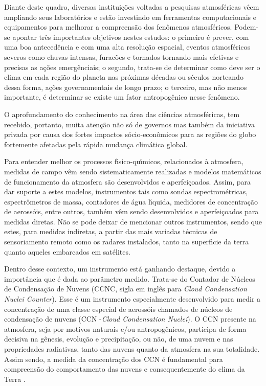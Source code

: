 Diante deste quadro, diversas institui\c{c}\~{o}es voltadas a pesquisas
atmosf\'{e}ricas v\^{e}em ampliando seus laborat\'{o}rios e est\~{a}o investindo em
ferramentas computacionais e equipamentos para melhorar a
compreens\~{a}o dos fen\^{o}menos atmosf\'{e}ricos.  Podem-se apontar tr\^{e}s importantes objetivos nestes estudos: o primeiro \'{e} prever, com uma boa anteced\^{e}ncia e com uma alta resolu\c{c}\~{a}o espacial,  eventos atmosf\'{e}ricos severos como chuvas intensas, furac\~{o}es e tornados tornando mais efetivas e precisas as a\c{c}\~{o}es emerg\^{e}nciais; o segundo, trata-se  de determinar como deve ser o clima em cada regi\~{a}o do planeta nas pr\'{o}ximas d\'{e}cadas ou s\'{e}culos norteando dessa forma, a\c{c}\~{o}es governamentais de longo prazo; o terceiro, mas n\~{a}o menos importante, \'{e} determinar se existe um fator antropog\^{e}nico nesse fen\^{o}meno.

O aprofundamento do conhecimento na \'{a}rea das ci\^{e}ncias atmosf\'{e}ricas, tem recebido, portanto, muita aten\c{c}\~{a}o n\~{a}o s\'{o} de governos mas tamb\'{e}m da iniciativa privada por causa dos fortes impactos s\'{o}cio-econ\^{o}micos para as regi\~{o}es do globo fortemente afetadas pela r\'{a}pida mudan\c{c}a clim\'{a}tica global.

Para entender melhor os processos
f\'{\i}sico-qu\'{\i}micos, relacionados \`{a} atmosfera, medidas de campo v\^{e}m sendo
sistematicamente realizadas e modelos matem\'{a}ticos de funcionamento
da atmosfera s\~{a}o desenvolvidos e aperfei\c{c}oados. Assim, para dar suporte a
estes modelos, instrumentos tais como sondas espectrom\'{e}tricas,
espectr\^{o}metros de massa, contadores de \'{a}gua l\'{\i}quida, medidores de
concentra\c{c}\~{a}o de aeross\'{o}is, entre outros, tamb\'{e}m v\^{e}m sendo
desenvolvidos e aperfei\c{c}oados para medidas diretas. N\~{a}o se pode
deixar de mencionar outros instrumentos, sendo que estes, para
medidas indiretas, a partir das mais variadas t\'{e}cnicas de
sensoriamento remoto como os radares instalados, tanto na superf\'{\i}cie da terra quanto
aqueles embarcados em sat\'{e}lites.

Dentro desse contexto, um instrumento est\'{a} ganhando destaque,
devido a import\^{a}ncia que \'{e} dada ao par\^{a}metro medido.
Trata-se do Contador de N\'{u}cleos de Condensa\c{c}\~{a}o de Nuvens (CCNC, sigla em ingl\^{e}s para
\textit{Cloud Condensation Nuclei Counter}). Esse \'{e} um instrumento
especialmente desenvolvido para medir a concentra\c{c}\~{a}o de uma
classe especial de aeross\'{o}is chamados de n\'{u}cleos de condensa\c{c}\~{a}o de nuvens (CCN -\textit{Cloud
Condensation Nuclei}). O CCN presente na atmosfera, seja por motivos
naturais e/ou antropog\^{e}nicos, participa de forma decisiva na
g\^{e}nesis, evolu\c{c}\~{a}o e precipita\c{c}\~{a}o, ou n\~{a}o, de uma nuvem e nas
propriedades radiativas, tanto das nuvens quanto da atmosfera na sua
totalidade. Assim sendo, a medida da concentra\c{c}\~{a}o dos CCN \'{e}
fundamental para compreens\~{a}o do comportamento das nuvens e
consequentemente do clima da Terra \cite{McMurry,Meteorologia,Roberts,Rosenfeld}.

